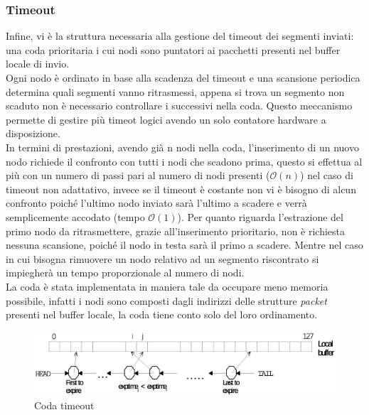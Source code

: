 \subsubsection{Timeout}
Infine, vi è la struttura necessaria alla gestione del timeout dei segmenti
inviati: una coda prioritaria i cui nodi sono puntatori
ai pacchetti presenti nel buffer locale di invio.\\
Ogni nodo è ordinato in base alla scadenza del timeout e una scansione 
periodica determina quali segmenti vanno ritrasmessi, appena si trova un 
segmento non scaduto non è necessario controllare i successivi
nella coda.
Questo meccanismo permette di gestire più timeot logici avendo un solo 
contatore hardware a disposizione.\\
In termini di prestazioni, avendo già n nodi nella coda, 
l'inserimento di un nuovo nodo richiede il confronto con tutti i
nodi che scadono prima, questo si effettua al più con un numero di passi
pari al numero di nodi presenti ($\mathcal{O}(n)$)
nel caso di timeout non adattativo, invece se il timeout è costante non vi è bisogno
di alcun confronto poiché l'ultimo nodo inviato sarà l'ultimo a scadere e 
verrà semplicemente accodato (tempo $\mathcal{O}(1)$).
Per quanto riguarda l'estrazione del primo nodo da ritrasmettere, grazie 
all'inserimento prioritario, non è richiesta nessuna scansione, poiché il nodo 
in testa sarà il primo a scadere. Mentre nel caso in cui bisogna rimuovere un
nodo relativo ad un segmento riscontrato si impiegherà un tempo 
proporzionale al numero di nodi.\\
La coda è stata implementata in maniera tale da occupare meno memoria possibile,
infatti i nodi sono composti dagli indirizzi delle strutture \emph{packet}
presenti nel buffer locale, la coda tiene conto solo del loro ordinamento.
%
\begin{figure}[!h]
\includegraphics[scale=0.35]{images/queue}
\caption{Coda timeout}
\end{figure}
%
